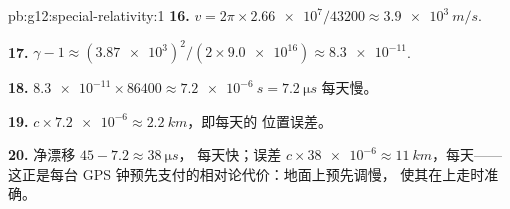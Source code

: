 \begin{solution}{pb:g12:special-relativity:1}
\textbf{16.} $v = 2\pi \times \num{2.66e7}/\num{43200} \approx
\qty{3.9e3}{m/s}$.

\textbf{17.} $\gamma - 1 \approx (\num{3.87e3})^2/(2 \times
\num{9.0e16}) \approx \num{8.3e-11}$.

\textbf{18.} $\num{8.3e-11} \times \num{86400} \approx \qty{7.2e-6}{s}
= \qty{7.2}{\micro s}$ 每天慢。

\textbf{19.} $c \times \num{7.2e-6} \approx \qty{2.2}{km}$，即每天的
位置误差。

\textbf{20.} 净漂移 $45 - 7.2 \approx \qty{38}{\micro s}$，
每天快；误差 $c \times \num{38e-6} \approx \qty{11}{km}$，每天——
这正是每台 GPS 钟预先支付的相对论代价：地面上预先调慢，
使其在上走时准确。
\end{solution}
